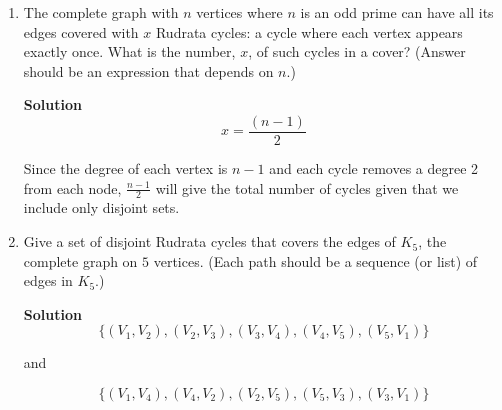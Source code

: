 \documentclass[11pt]{article}
\newenvironment{Parts}{\begin{enumerate}[label=(\alph*)]}{\end{enumerate}}
\newcommand*{\Part}{\item}
\newenvironment{Answer}{\vspace{10pt}\begin{mdframed}\textbf{Solution}\\}{\end{mdframed}\vfill\pagebreak[3]}
\newenvironment{Answer}{\vspace{10pt}}{\vfill\pagebreak[3]}
\begin{document}
\begin{Parts}
\begin{Answer}
Since $n \geq 3$, there cannot exist a value of $n$ where $n>2^n+1$. Thus, the proposition is false.
\end{Answer}


\Part
The complete graph with $n$ vertices where $n$ is an odd prime can have all its edges
covered with $x$ Rudrata cycles: a cycle where
each vertex appears exactly once. What is the number, $x$,  of
such cycles in a cover? (Answer should be an expression that depends on $n$.)

\begin{Answer}
$$x=\frac{(n-1)}{2}$$

Since the degree of each vertex is $n-1$ and each cycle removes a degree 2 from each node, $\frac{n-1}{2}$ will give the total number of cycles given that we include only disjoint sets. 
\end{Answer}

\Part
Give a set of disjoint Rudrata cycles that covers the edges of $K_5$, the complete
graph on $5$ vertices.
(Each path should be a sequence (or list) of edges in $K_5$.)

\begin{Answer}
$$\{(V_1,V_2), (V_2,V_3), (V_3,V_4), (V_4,V_5), (V_5,V_1)\}$$ 
\begin{center}
and
\end{center}
$$\{ (V_1, V_4), (V_4, V_2), (V_2, V_5), (V_5, V_3), (V_3, V_1)\}$$
\end{Answer}

\end{Parts}

\end{document}
